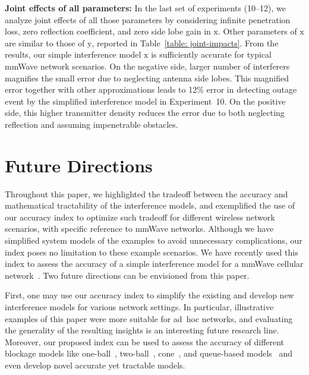 \documentclass[12pt, draftclsnofoot, onecolumn]{IEEEtran}
\begin{document}
\textbf{Joint effects of all parameters:} In the last set of experiments (10--12), we analyze joint effects of all those parameters by considering infinite penetration loss, zero reflection coefficient, and zero side lobe gain in $\mathrm{x}$. Other parameters of $\mathrm{x}$ are similar to those of $\mathrm{y}$, reported in Table~\ref{table: joint-impacts}. From the results, our simple interference model $\mathrm{x}$ is sufficiently accurate for typical mmWave network scenarios.
On the negative side, larger number of interferers magnifies the small error due to neglecting antenna side lobes. This magnified error together with other approximations leads to 12\% error in detecting outage event by the simplified interference model in Experiment~10. On the positive side, this higher transmitter density reduces the error due to both neglecting reflection and assuming impenetrable obstacles.

\section{Future Directions}\label{sec: future_directions}
Throughout this paper, we highlighted the tradeoff between the accuracy and mathematical tractability of the interference models, and exemplified the use of our accuracy index to optimize such tradeoff for different wireless network scenarios, with specific reference to mmWave networks. Although we have simplified system models of the examples to avoid unnecessary complications, our index poses no limitation to these example scenarios. We have recently used this index to assess the accuracy of a simple interference model for a mmWave cellular network~\cite{jiang2016simplified}.
Two future directions can be envisioned from this paper.

First, one may use our accuracy index to simplify the existing and develop new interference models for various network settings. In particular, illustrative examples of this paper were more suitable for ad~hoc networks, and evaluating the generality of the resulting insights is an interesting future research line. Moreover, our proposed index can be used to assess the accuracy of different blockage models like one-ball~\cite{TBai2014Blockage}, two-ball~\cite{di2014stochastic}, cone~\cite{Shokri2015Transitional}, and queue-based models~\cite{Congiu2016RelayFalback} and even develop novel accurate yet tractable models.
\end{document}
